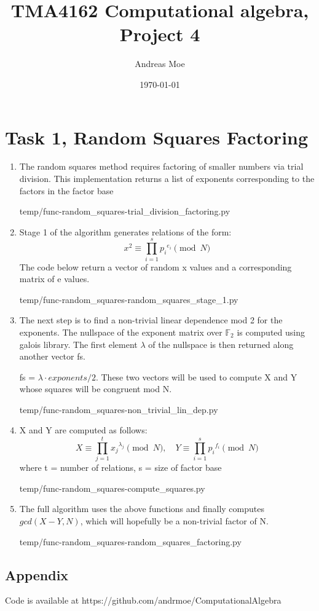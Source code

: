 \documentclass[12pt,a4paper]{article}
\title{TMA4162 Computational algebra, Project 4}
\author{Andreas Moe}
\date{\today}
\begin{document}
\maketitle

\section*{Task 1, Random Squares Factoring}
\begin{enumerate}[]
    \item
    The random squares method requires factoring of smaller numbers via trial division.
    This implementation returns a list of exponents corresponding to the factors in the factor base
    
    {temp/func-random_squares-trial_division_factoring.py}
    \item
    Stage 1 of the algorithm generates relations of the form:
    \[x^2 \equiv \prod_{i=1}^s {p_i}^{e_i} \pmod{N}\]
    The code below return a vector of random x values and a corresponding matrix of e values.
    
    {temp/func-random_squares-random_squares_stage_1.py}
    \item
    The next step is to find a non-trivial linear dependence mod 2 for the exponents.
    The nullspace of the exponent matrix over \(\mathbb{F}_2\) is computed using galois library.
    The first element \(\lambda\) of the nullspace is then returned along another vector fs.

    fs = \(\lambda\cdot exponents / 2\).
    These two vectors will be used to compute X and Y whose squares will be congruent mod N.
    
    {temp/func-random_squares-non_trivial_lin_dep.py}
    \item
    X and Y are computed as follows:
    \[X \equiv \prod_{j=1}^{t} {x_j}^{\lambda_j} \pmod{N}, \quad Y \equiv \prod_{i=1}^{s} {p_i}^{f_i} \pmod{N}\]
    where t = number of relations, s = size of factor base
    
    {temp/func-random_squares-compute_squares.py}
    \item
    The full algorithm uses the above functions and finally computes \(gcd(X-Y, N)\), which will hopefully be a
    non-trivial factor of N.
    
    {temp/func-random_squares-random_squares_factoring.py}



\end{enumerate}



\newpage
\begin{appendix}
\section*{Appendix}
    Code is available at https://github.com/andrmoe/ComputationalAlgebra
    
\end{appendix}
\end{document}
